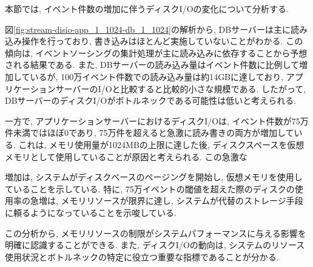 \documentclass[../../../../../main]{subfiles}
\begin{document}
    \label{subsubsubsec:result-streaming-only-limit-diskio}

    本節では, イベント件数の増加に伴うディスクI/Oの変化について分析する.

    

    図\ref{fig:stream-disio-app_1_1024-db_1_1024}の解析から, DBサーバーは主に読み込み操作を行っており, 書き込みはほとんど実施していないことがわかる. この傾向は, イベントソーシングの集計処理が主に読み込みに依存することから予想される結果である. また, DBサーバーの読み込み量はイベント件数に比例して増加しているが, 100万イベント件数での読み込み量は約14GBに達しており, アプリケーションサーバーのI/Oと比較すると比較的小さな規模である. したがって, DBサーバーのディスクI/Oがボトルネックである可能性は低いと考えられる.

    一方で, アプリケーションサーバーにおけるディスクI/Oは, イベント件数が75万件未満ではほぼ0であり, 75万件を超えると急激に読み書きの両方が増加している. これは, メモリ使用量が1024MBの上限に達した後, ディスクスペースを仮想メモリとして使用していることが原因と考えられる. この急激な

    増加は, システムがディスクベースのページングを開始し, 仮想メモリを使用していることを示している. 特に, 75万イベントの閾値を超えた際のディスクの使用率の急増は, メモリリソースが限界に達し, システムが代替のストレージ手段に頼るようになっていることを示唆している.

    この分析から, メモリリソースの制限がシステムパフォーマンスに与える影響を明確に認識することができる. また, ディスクI/Oの動向は, システムのリソース使用状況とボトルネックの特定に役立つ重要な指標であることが分かる.
\end{document}
